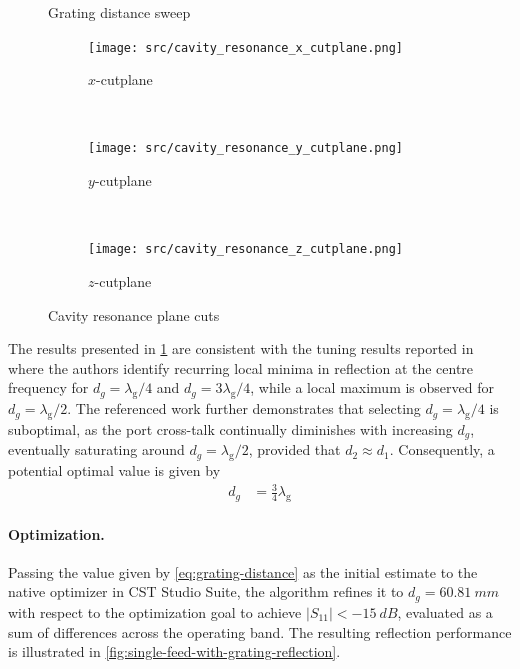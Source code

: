 \documentclass[11pt,a4paper,twoside,openany]{report}
\begin{document}
\begin{figure}[bh]
    \centering
    
    \caption{\label{fig:grating-distance-sweep}Grating distance sweep}
\end{figure}

\begin{figure}[th]
    \centering
    \begin{subfigure}{.3\textwidth}
        \centering
        \texttt{[image: src/cavity\_resonance\_x\_cutplane.png]}
        \caption{\label{fig:cavity-resonance-x-cutplane}$x$-cutplane}
    \end{subfigure}
    ~
    \begin{subfigure}{.3\textwidth}
        \centering
        \texttt{[image: src/cavity\_resonance\_y\_cutplane.png]}
        \caption{\label{fig:cavity-resonance-y-cutplane}$y$-cutplane}
    \end{subfigure}
    ~
    \begin{subfigure}{.3\textwidth}
        \centering
        \texttt{[image: src/cavity\_resonance\_z\_cutplane.png]}
        \caption{\label{fig:cavity-resonance-z-cutplane}$z$-cutplane}
    \end{subfigure}
    \caption{\label{fig:cavity-resonant}Cavity resonance plane cuts}
\end{figure}

The results presented in \cref{fig:grating-distance-sweep} are consistent with the tuning results reported in~\parencite{karki-et-al:dual-polarized-probe-for-planar-near-field-measurement} where the authors identify recurring local minima in reflection at the centre frequency for $d_g = \lambda_{\mathrm g}/4$ and $d_g = 3\lambda_{\mathrm g}/4$, while a local maximum is observed for $d_g = \lambda_{\mathrm g}/2$. The referenced work further demonstrates that selecting $d_g = \lambda_{\mathrm g}/4$ is suboptimal, as the port cross-talk continually diminishes with increasing $d_g$, eventually saturating around $d_g = \lambda_{\mathrm g}/2$, provided that $d_2\approx d_1$. Consequently, a potential optimal value is given by
\begin{align}
    \label{eq:grating-distance}
    d_g &= \frac{3}{4}\lambda_{\mathrm g}
\end{align}

\paragraph{Optimization.} Passing the value given by \cref{eq:grating-distance} as the initial estimate to the native optimizer in CST Studio Suite, the algorithm refines it to $d_g = \qty{60.81}{mm}$ with respect to the optimization goal to achieve $|S_{11}| < -\qty{15}{dB}$, evaluated as a sum of differences across the operating band. The resulting reflection performance is illustrated in \cref{fig:single-feed-with-grating-reflection}.
\end{document}

